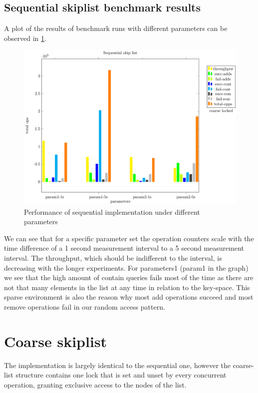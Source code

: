 \documentclass{article}
\begin{document}
\subsection{Sequential skiplist benchmark results}

A plot of the results of benchmark runs with different parameters can be observed in \ref{fig:sequential_plot}.

\begin{figure}[ht!]
  \centering
  \includegraphics[width=\textwidth]{../plots/sequential_throughput.pdf}
  \caption{Performance of sequential implementation under different parameters}
  \label{fig:sequential_plot}
\end{figure}

We can see that for a specific parameter set the operation counters scale with the time difference of a 1 second measurement interval to a 5 second measurement interval. The throughput, which should be indifferent to the interval, is decreasing with the longer experiments.
For parameters1 (param1 in the graph) we see that the high amount of contain queries fails most of the time as there are not that many elements in the list at any time in relation to the key-space.
This sparse environment is also the reason why most add operations succeed and most remove operations fail in our random access pattern.

\newpage

\section{Coarse skiplist}

The implementation is largely identical to the sequential one, however the coarse-list structure contains one lock that is set and unset by every concurrent operation, granting exclusive access to the nodes of the list.
\end{document}
